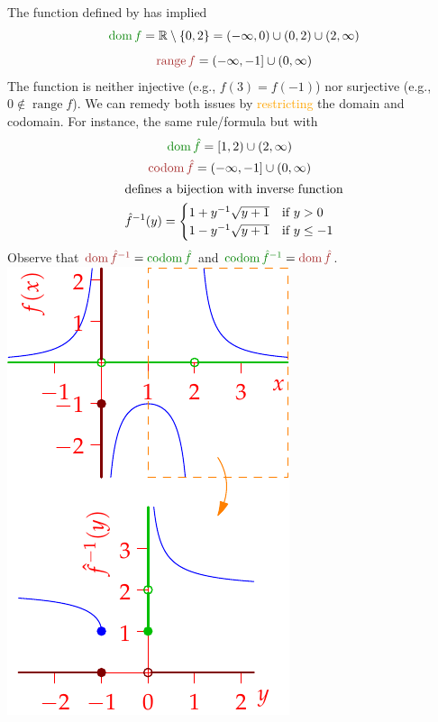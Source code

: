 \begin{example}[lower separated=false, sidebyside, sidebyside align=top seam, sidebyside gap=0pt, righthand width=0.32\linewidth]{}{}
	The function defined by  has implied
	\begin{gather*}
		\textcolor{Green}{\dom f}=\R\setminus\{0,2\}=(-\infty,0)\cup(0,2)\cup (2,\infty)\\[5pt]
		\textcolor{Brown}{\operatorname{range} f}=(-\infty,-1]\cup(0,\infty)
	\end{gather*}
	The function is neither injective (e.g., $f(3)=f(-1)$) nor surjective (e.g., $0\not\in\operatorname{range}f$).\smallbreak
	We can remedy both issues by \textcolor{orange}{restricting} the domain and codomain. For instance, the same rule/formula but with
	\begin{gather*}
		\textcolor{Green}{\dom\hat f}=[1,2)\cup(2,\infty)\\
		\textcolor{Brown}{\operatorname{codom}\hat f}=(-\infty,-1]\cup(0,\infty)\\
		\intertext{defines a bijection with inverse function}
		\hat f^{-1}(y)=
		\begin{cases}
			1+y^{-1}\sqrt{y+1}&\text{if }y>0\\
			1-y^{-1}\sqrt{y+1}&\text{if }y\le -1
		\end{cases}
	\end{gather*}
	Observe that $\textcolor{Brown}{\dom\hat f^{-1}}=\textcolor{Green}{\operatorname{codom}\hat f}$ and $\textcolor{Green}{\operatorname{codom}\hat f^{-1}}=\textcolor{Brown}{\dom\hat f}$.
	\tcblower
	\flushright\includegraphics{dom4}
\end{example}

